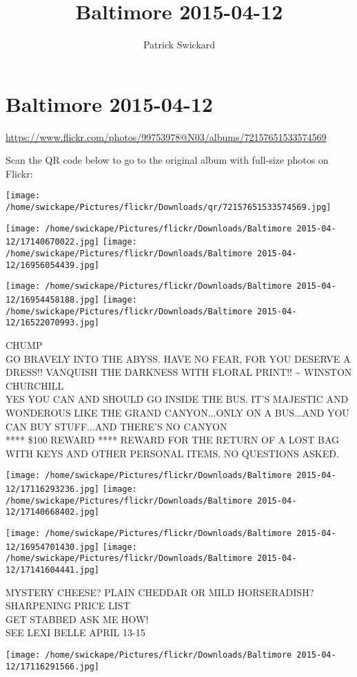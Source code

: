 \documentclass[10pt,letterpaper]{article}
\title{Baltimore 2015-04-12}
\author{Patrick Swickard}
\date{}
\begin{document}
\section*{Baltimore 2015-04-12}

\url{https://www.flickr.com/photos/99753978@N03/albums/72157651533574569}

Scan the QR code below to go to the original album with full-size photos on Flickr:

\texttt{[image: /home/swickape/Pictures/flickr/Downloads/qr/72157651533574569.jpg]}
\pagebreak

\texttt{[image: /home/swickape/Pictures/flickr/Downloads/Baltimore 2015-04-12/17140670022.jpg]}
\texttt{[image: /home/swickape/Pictures/flickr/Downloads/Baltimore 2015-04-12/16956054439.jpg]}

\texttt{[image: /home/swickape/Pictures/flickr/Downloads/Baltimore 2015-04-12/16954458188.jpg]}
\texttt{[image: /home/swickape/Pictures/flickr/Downloads/Baltimore 2015-04-12/16522070993.jpg]}

CHUMP\\
GO BRAVELY INTO THE ABYSS.  HAVE NO FEAR, FOR YOU DESERVE A DRESS!!  VANQUISH THE DARKNESS WITH FLORAL PRINT!!  \textasciitilde{} WINSTON CHURCHILL\\
YES YOU CAN AND SHOULD GO INSIDE THE BUS.  IT'S MAJESTIC AND WONDEROUS LIKE THE GRAND CANYON...ONLY ON A BUS...AND YOU CAN BUY STUFF...AND THERE'S NO CANYON\\
**** \$100 REWARD **** REWARD FOR THE RETURN OF A LOST BAG WITH KEYS AND OTHER PERSONAL ITEMS.  NO QUESTIONS ASKED.
\pagebreak

\texttt{[image: /home/swickape/Pictures/flickr/Downloads/Baltimore 2015-04-12/17116293236.jpg]}
\texttt{[image: /home/swickape/Pictures/flickr/Downloads/Baltimore 2015-04-12/17140668402.jpg]}

\texttt{[image: /home/swickape/Pictures/flickr/Downloads/Baltimore 2015-04-12/16954701430.jpg]}
\texttt{[image: /home/swickape/Pictures/flickr/Downloads/Baltimore 2015-04-12/17141604441.jpg]}

MYSTERY CHEESE?  PLAIN CHEDDAR OR MILD HORSERADISH?\\
SHARPENING PRICE LIST\\
GET STABBED ASK ME HOW!\\
SEE LEXI BELLE APRIL 13{-}15
\pagebreak

\texttt{[image: /home/swickape/Pictures/flickr/Downloads/Baltimore 2015-04-12/17116291566.jpg]}
\end{document}
